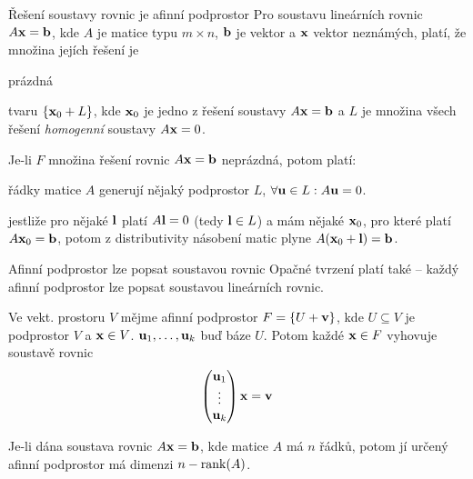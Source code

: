 \begin{vetaN}{Řešení soustavy rovnic je afinní podprostor}
Pro soustavu lineárních rovnic $A\mathbf{x}=\mathbf{b}$, kde $A$ je matice typu $m\times n$, $\mathbf{b}$ je vektor  a $\mathbf{x}$ vektor neznámých, platí, že množina jejích řešení je
\begin{penumerate}
    \renewcommand{\labelenumi}{\alph{enumi})} 
    \item prázdná
    \item tvaru $\{\mathbf{x}_0+L\}$, kde $\mathbf{x}_0$ je jedno z řešení soustavy $A\mathbf{x}=\mathbf{b}$ a $L$ je množina všech řešení \emph{homogenní} soustavy $A\mathbf{x}=0$.
\end{penumerate}

\begin{dukaz}
Je-li $F$ množina řešení rovnic $A\mathbf{x}=\mathbf{b}$ neprázdná, potom platí:
\begin{penumerate}
    \item řádky matice $A$ generují nějaký podprostor $L$, $\forall\mathbf{u}\in L:A\mathbf{u}=0$.
    \item jestliže pro nějaké $\mathbf{l}$ platí $A\mathbf{l}=0$ (tedy $\mathbf{l}\in L$) a mám nějaké $\mathbf{x}_0$, pro které platí $A\mathbf{x}_0=\mathbf{b}$, potom z distributivity násobení matic plyne $A(\mathbf{x}_0+\mathbf{l})=\mathbf{b}$.
\end{penumerate}
\end{dukaz}
\end{vetaN}

\begin{vetaN}{Afinní podprostor lze popsat soustavou rovnic}
Opačné tvrzení platí také -- každý afinní podprostor lze popsat soustavou lineárních rovnic.

\begin{dukaz}
Ve vekt. prostoru $V$ mějme afinní podprostor $F=\{U+\mathbf{v}\}$, kde $U\subseteq V$ je podprostor $V$ a $\mathbf{x}\in V$. $\mathbf{u}_1,\dots,\mathbf{u}_k$ buď báze $U$. Potom každé $\mathbf{x}\in F$ vyhovuje soustavě rovnic
$$\left(\begin{matrix}\mathbf{u}_1\\\vdots\\\mathbf{u}_k\end{matrix}\right)\mathbf{x}=\mathbf{v}$$
\end{dukaz}
\end{vetaN}

\begin{dusledek}
Je-li dána soustava rovnic $A\mathbf{x}=\mathbf{b}$, kde matice $A$ má $n$ řádků, potom jí určený afinní podprostor má dimenzi $n - \mathrm{rank}(A)$.
\end{dusledek}


